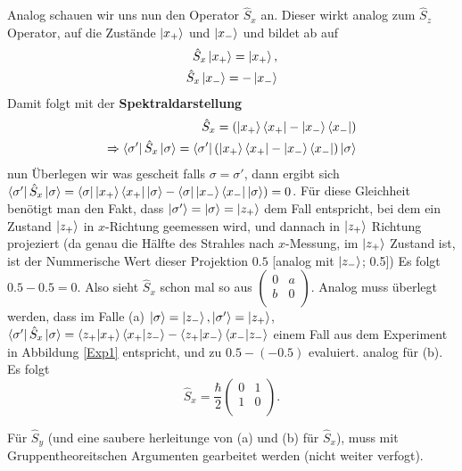 \documentclass{article}
\begin{document}
Analog schauen wir uns nun den Operator $\hat{S}_x$ an. Dieser wirkt analog zum $\hat{S}_z$ Operator, auf die Zustände $\ket{x_+}$ und $\ket{x_-}$ und bildet ab auf 
\begin{align}
\hat{S}_x \ket{x_+} = \ket{x_+},\\
\hat{S}_x \ket{x_-} = -\ket{x_-}
\end{align}
Damit folgt mit der \textbf{Spektraldarstellung}
\begin{align}
\hat{S}_x = (\ket{x_+}\bra{x_+}- \ket{x_-}\bra{x_-})\\
\Rightarrow \bra{\sigma'}\hat{S}_x\ket{\sigma} = \bra{\sigma'}(\ket{x_+}\bra{x_+}- \ket{x_-}\bra{x_-})\ket{\sigma}
\end{align}
nun Überlegen wir was gescheit falls $\sigma = \sigma'$, dann ergibt sich $\bra{\sigma'}\hat{S}_x\ket{\sigma}=\bra{\sigma}\ket{x_+}\bra{x_+}\ket{\sigma}- \bra{\sigma}\ket{x_-}\bra{x_-}\ket{\sigma}) = 0$.\color{gray} Für diese Gleichheit benötigt man den Fakt, dass $\ket{\sigma'} = \ket{\sigma} = \ket{z_+}$ dem Fall entspricht, bei dem ein Zustand $\ket{z_+}$ in $x$-Richtung geemessen wird, und dannach in $\ket{z_+}$ Richtung projeziert (da genau die Hälfte des Strahles nach $x$-Messung, im $\ket{z_+}$ Zustand ist, ist der Nummerische Wert dieser Projektion $0.5$ [analog mit $\ket{z_-}$; 0.5]) Es folgt $0.5 - 0.5 = 0$.\color{black} Also sieht $\hat{S}_x$ schon mal so aus $\begin{pmatrix}
0& a \\
b& 0 \\
\end{pmatrix}$.
\newline
Analog muss überlegt werden, dass im Falle (a) $\ket{\sigma} = \ket{z_-}, \ket{\sigma'} = \ket{z_+}$, $\bra{\sigma'}\hat{S}_x\ket{\sigma} = \braket{z_+|x_+}\braket{x_+|z_-}- \braket{z_+|x_-}\braket{x_-|z_-}$ einem Fall aus dem Experiment in Abbildung \ref{Exp1} entspricht, und zu $0.5-(-0.5)$ evaluiert. analog für (b).
Es folgt
\begin{equation}
\hat{S}_x = \frac{\hbar}{2}\begin{pmatrix}
0& 1 \\
1& 0 \\
\end{pmatrix}.
\end{equation}

Für $\hat{S}_y$ (und eine saubere herleitunge von (a) und (b) für $\hat{S}_x$), muss mit Gruppentheoreitschen Argumenten gearbeitet werden (nicht weiter verfogt).
\newline
\end{document}

